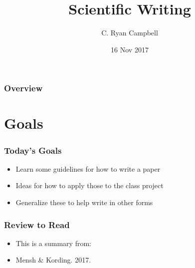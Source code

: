 \documentclass[14pt,handout]{beamer}
\title[SciWrite]{Scientific Writing} %
\author{C. Ryan Campbell} %
\institute[Duke] %
{
Duke University \\ %
\medskip
\textit{c.ryan.campbell@duke.edu} %
}
\date{16 Nov 2017} %
\begin{document}
\begin{frame}
\titlepage %
\end{frame}


\begin{frame}
\frametitle{Overview} %
\tableofcontents %
\end{frame}


\section{Goals} 

\begin{frame}
\frametitle{Today's Goals}
\begin{itemize}
	\item<+-> Learn some guidelines for how to write a paper
	\item<+-> Ideas for how to apply those to the class project
	\item<+-> Generalize these to help write in other forms
\end{itemize}
\end{frame}

\begin{frame}
\frametitle{Review to Read}
\begin{itemize}
	\item<+-> This is a summary from:
	\item<+-> Mensh \& Kording. 2017.
\end{itemize}
\end{frame}
\end{document}
